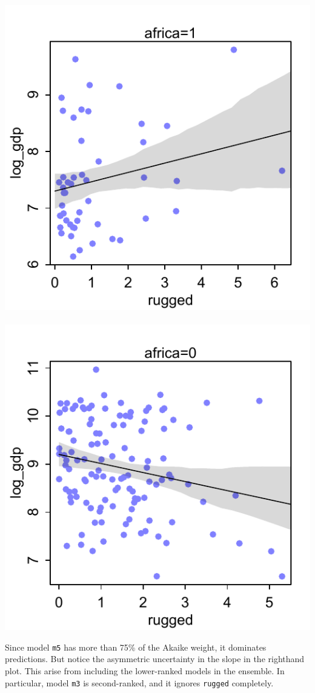 \documentclass[11pt,reqno]{amsart}
\newcommand{\ttx}[1]{\texttt{#1}}
\begin{document}
\begin{center}
\includegraphics[scale=0.7]{figures/fig_africa1.pdf}~\includegraphics[scale=0.7]{figures/fig_africa0.pdf}
\end{center}
Since model \ttx{m5} has more than 75\% of the Akaike weight, it dominates predictions. But notice the asymmetric uncertainty in the slope in the righthand plot. This arise from including the lower-ranked models in the ensemble. In particular, model \ttx{m3} is second-ranked, and it ignores \ttx{rugged} completely.
\end{document}
